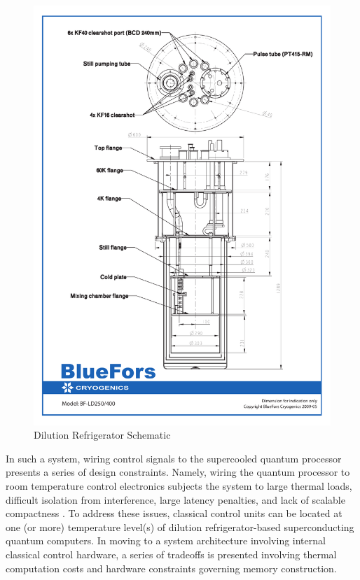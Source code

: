 \begin{figure}[h]
  \centering
	\includegraphics[width=\linewidth]{Figures/model_BF_LD_1.png}
	\caption{Dilution Refrigerator Schematic}
	\label{fig:fridge}
\end{figure}

In such a system, wiring control signals to the supercooled quantum processor presents a series of design constraints. Namely, wiring the quantum processor to room temperature control electronics subjects the system to large thermal loads, difficult isolation from interference, large latency penalties, and lack of scalable compactness . To address these issues, classical control units can be located at one (or more) temperature level(s) of dilution refrigerator-based superconducting quantum computers. In moving to a system architecture involving internal classical control hardware, a series of tradeoffs is presented involving thermal computation costs and hardware constraints governing memory construction. 

